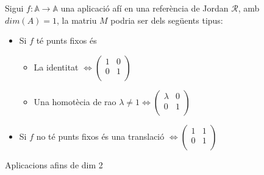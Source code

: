Sigui $f:\mathbb{A}\to\mathbb{A}$ una aplicació afí en una referència de Jordan $\mathcal{R}$, amb $dim(A)=1$, la matriu $M$ podria ser dels següents tipus:
\begin{itemize}
	\item Si $f$ té punts fixos és
	\begin{itemize}
		\item La identitat $\iff\left(\begin{array}{c|c}1&0\\\hline0&1\\\end{array}\right)$ 
		\item Una homotècia de rao $\lambda\neq 1\iff\left(\begin{array}{c|c}\lambda&0\\\hline0&1\\\end{array}\right)$
	\end{itemize}
	\item Si $f$ no té punts fixos és una translació $\iff\left(\begin{array}{c|c}1&1\\\hline0&1\\\end{array}\right)$
\end{itemize}

Aplicacions afins de dim 2

